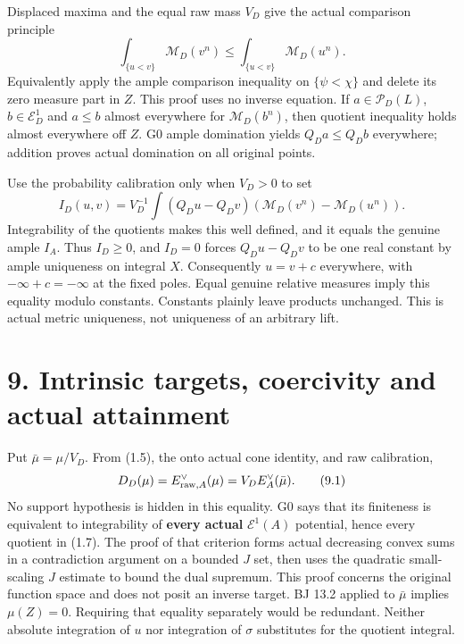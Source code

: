 \documentclass[
  10pt,
]{article}
\begin{document}
Displaced maxima and the equal raw mass \(V_D\) give the actual
comparison principle \[
    \int_{\{u<v\}}\mathcal M_D(v^n)
                  \leq\int_{\{u<v\}}\mathcal M_D(u^n).         \tag{8.1}
\] Equivalently apply the ample comparison inequality on
\(\{\psi<\chi\}\) and delete its zero measure part in \(Z\). This proof
uses no inverse equation. If \(a\in\mathcal P_D(L)\),
\(b\in\mathcal E_D^1\) and \(a\leq b\) almost everywhere for
\(\mathcal M_D(b^n)\), then quotient inequality holds almost everywhere
off \(Z\). G0 ample domination yields \(Q_Da\leq Q_Db\) everywhere;
addition proves actual domination on all original points.

Use the probability calibration only when \(V_D>0\) to set \[
 I_D(u,v)=V_D^{-1}\int(Q_Du-Q_Dv)
                         (\mathcal M_D(v^n)-\mathcal M_D(u^n)). \tag{8.2}
\] Integrability of the quotients makes this well defined, and it equals
the genuine ample \(I_A\). Thus \(I_D\geq0\), and \(I_D=0\) forces
\(Q_Du-Q_Dv\) to be one real constant by ample uniqueness on integral
\(X\). Consequently \(u=v+c\) everywhere, with \(-\infty+c=-\infty\) at
the fixed poles. Equal genuine relative measures imply this equality
modulo constants. Constants plainly leave products unchanged. This is
actual metric uniqueness, not uniqueness of an arbitrary lift.

\section{9. Intrinsic targets, coercivity and actual
attainment}\label{intrinsic-targets-coercivity-and-actual-attainment}

Put \(\bar\mu=\mu/V_D\). From (1.5), the onto actual cone identity, and
raw calibration, \[
 D_D(\mu)=E_{{\rm raw},A}^{\vee}(\mu)
                      =V_D E_A^{\vee}(\bar\mu).               \tag{9.1}
\] No support hypothesis is hidden in this equality. G0 says that its
finiteness is equivalent to integrability of \textbf{every actual}
\(\mathcal E^1(A)\) potential, hence every quotient in (1.7). The proof
of that criterion forms actual decreasing convex sums in a contradiction
argument on a bounded \(J\) set, then uses the quadratic small-scaling
\(J\) estimate to bound the dual supremum. This proof concerns the
original function space and does not posit an inverse target. BJ 13.2
applied to \(\bar\mu\) implies \(\mu(Z)=0\). Requiring that equality
separately would be redundant. Neither absolute integration of \(u\) nor
integration of \(\sigma\) substitutes for the quotient integral.
\end{document}
